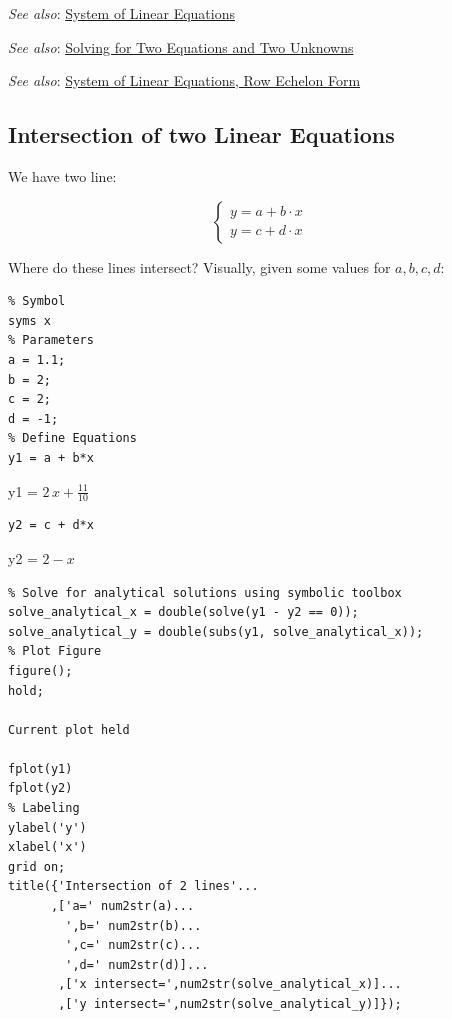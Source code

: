 \documentclass[
]{book}
\begin{document}
\emph{See also}: \href{https://fanwangecon.github.io/Math4Econ/matrix_system_of_equations/matrix_linear_equations.html}{System of Linear
Equations}

\emph{See also}: \href{https://fanwangecon.github.io/Math4Econ/matrix_system_of_equations/matrix_linear_system_2.html}{Solving for Two Equations and Two
Unknowns}

\emph{See also}: \href{https://fanwangecon.github.io/Math4Econ/matrix_system_of_equations/matrix_row_echelon_form.html}{System of Linear Equations, Row Echelon
Form}

\hypertarget{intersection-of-two-linear-equations}{%
\subsection{Intersection of two Linear Equations}\label{intersection-of-two-linear-equations}}

We have two line:

\[\left\lbrace \begin{array}{c}
y=a+b\cdot x\\
y=c+d\cdot x
\end{array}\right.\]

Where do these lines intersect? Visually, given some values for
\(a,b,c,d\):

\begin{verbatim}
% Symbol
syms x 
% Parameters
a = 1.1;
b = 2;
c = 2;
d = -1;
% Define Equations
y1 = a + b*x
\end{verbatim}

y1 = \(\displaystyle 2\,x+\frac{11}{10}\)

\begin{verbatim}
y2 = c + d*x
\end{verbatim}

y2 = \(\displaystyle 2-x\)

\begin{verbatim}
% Solve for analytical solutions using symbolic toolbox
solve_analytical_x = double(solve(y1 - y2 == 0));
solve_analytical_y = double(subs(y1, solve_analytical_x));
% Plot Figure
figure();
hold;

Current plot held

fplot(y1)
fplot(y2)
% Labeling
ylabel('y')
xlabel('x')
grid on;
title({'Intersection of 2 lines'...
      ,['a=' num2str(a)...
        ',b=' num2str(b)...
        ',c=' num2str(c)...
        ',d=' num2str(d)]...
       ,['x intersect=',num2str(solve_analytical_x)]...
       ,['y intersect=',num2str(solve_analytical_y)]});
\end{verbatim}
\end{document}
